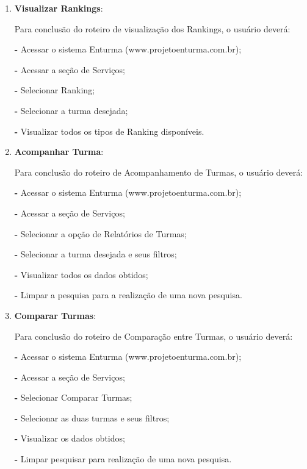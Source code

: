 	\begin{enumerate}
		\item \textbf{Visualizar Rankings}:

			Para conclusão do roteiro de visualização dos Rankings, o usuário deverá:

				\textbf{-} Acessar o sistema Enturma (www.projetoenturma.com.br);
				
				\textbf{-} Acessar a seção de Serviços;
				
				\textbf{-} Selecionar Ranking;
				
				\textbf{-} Selecionar a turma desejada;
				
				\textbf{-} Visualizar todos os tipos de Ranking disponíveis.

		\item \textbf{Acompanhar Turma}:
			
			Para conclusão do roteiro de Acompanhamento de Turmas, o usuário deverá:
				
				\textbf{-} Acessar o sistema Enturma (www.projetoenturma.com.br);
				
				\textbf{-} Acessar a seção de Serviços;
				
				\textbf{-} Selecionar a opção de Relatórios de Turmas;
				
				\textbf{-} Selecionar a turma desejada e seus filtros;
				
				\textbf{-} Visualizar todos os dados obtidos;
				
				\textbf{-} Limpar a pesquisa para a realização de uma nova pesquisa.

		\item \textbf{Comparar Turmas}:

			Para conclusão do roteiro de Comparação entre Turmas, o usuário deverá:
				
				\textbf{-} Acessar o sistema Enturma (www.projetoenturma.com.br);
				
				\textbf{-} Acessar a seção de Serviços;
				
				\textbf{-} Selecionar Comparar Turmas;
				
				\textbf{-} Selecionar as duas turmas e seus filtros;
				
				\textbf{-} Visualizar os dados obtidos;
				
				\textbf{-} Limpar pesquisar para realização de uma nova pesquisa.

	\end{enumerate}

